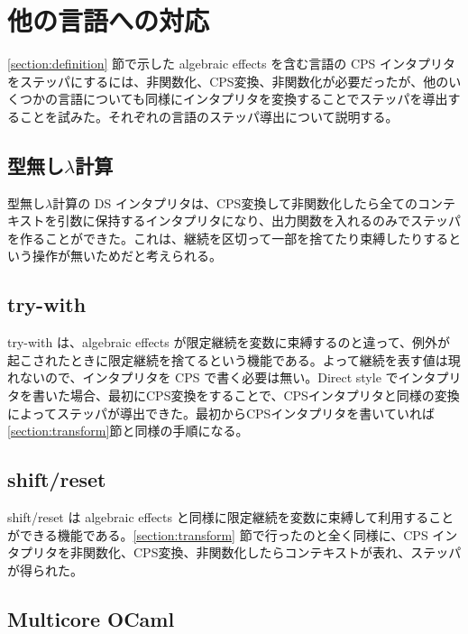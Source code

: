 \section{他の言語への対応}
\label{section:languages}

\ref{section:definition} 節で示した algebraic effects を含む言語の CPS インタプリタをステッパにするには、非関数化、CPS変換、非関数化が必要だったが、他のいくつかの言語についても同様にインタプリタを変換することでステッパを導出することを試みた。それぞれの言語のステッパ導出について説明する。


\subsection{型無し$\lambda$計算}
\label{subsection:lambda}

型無し$\lambda$計算の DS インタプリタは、CPS変換して非関数化したら全てのコンテキストを引数に保持するインタプリタになり、出力関数を入れるのみでステッパを作ることができた。これは、継続を区切って一部を捨てたり束縛したりするという操作が無いためだと考えられる。


\subsection{try-with}
\label{subsection:try_with}

try-with は、algebraic effects が限定継続を変数に束縛するのと違って、例外が起こされたときに限定継続を捨てるという機能である。よって継続を表す値は現れないので、インタプリタを CPS で書く必要は無い。Direct style でインタプリタを書いた場合、最初にCPS変換をすることで、CPSインタプリタと同様の変換によってステッパが導出できた。最初からCPSインタプリタを書いていれば \ref{section:transform}節と同様の手順になる。


\subsection{shift/reset}
\label{subsection:shift/reset}

shift/reset は algebraic effects と同様に限定継続を変数に束縛して利用することができる機能である。\ref{section:transform} 節で行ったのと全く同様に、CPS インタプリタを非関数化、CPS変換、非関数化したらコンテキストが表れ、ステッパが得られた。


\subsection{Multicore OCaml}
\label{subsection:multicore_ocaml}

